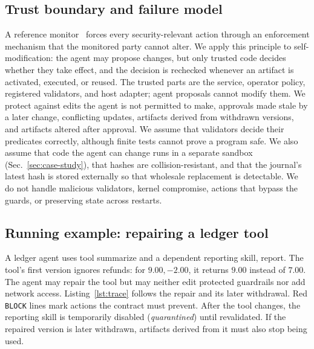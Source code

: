 \documentclass[letterpaper,journal]{IEEEtran}
\begin{document}
\subsection{Trust boundary and failure model}\label{sec:trust}
A reference monitor~\cite{schneider} forces every security-relevant action through an enforcement mechanism that the monitored party cannot alter. We apply this principle to self-modification: the agent may propose changes, but only trusted code decides whether they take effect, and the decision is rechecked whenever an artifact is activated, executed, or reused.
The trusted parts are the service, operator policy, registered validators, and host adapter; agent proposals cannot modify them. We protect against edits the agent is not permitted to make, approvals made stale by a later change, conflicting updates, artifacts derived from withdrawn versions, and artifacts altered after approval. We assume that validators decide their predicates correctly, although finite tests cannot prove a program safe. We also assume that code the agent can change runs in a separate sandbox (Sec.~\ref{sec:case-study}), that hashes are collision-resistant, and that the journal's latest hash is stored externally so that wholesale replacement is detectable. We do not handle malicious validators, kernel compromise, actions that bypass the guards, or preserving state across restarts.

\subsection{Running example: repairing a ledger tool}\label{sec:running}
A ledger agent uses tool \textsf{summarize} and a dependent reporting skill, \textsf{report}. The tool's first version ignores refunds: for $9.00,-2.00$, it returns $9.00$ instead of $7.00$. The agent may repair the tool but may neither edit protected \textsf{guardrails} nor add network access. Listing~\ref{lst:trace} follows the repair and its later withdrawal. Red \texttt{BLOCK} lines mark actions the contract must prevent. After the tool changes, the reporting skill is temporarily disabled (\emph{quarantined}) until revalidated. If the repaired version is later withdrawn, artifacts derived from it must also stop being used. 
\end{document}
